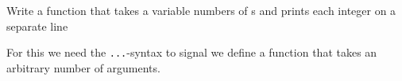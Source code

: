 \begin{Exercise}[title={Var args},difficulty=5]
\label{ex:varargs}
\Question\label{ex:varargs q1}
Write a function that takes a variable numbers of s and prints
each integer on a separate line
\end{Exercise}

\begin{Answer}
\Question
For this we need the \lstinline{...}-syntax to signal we define a
function that takes an arbitrary number of arguments.



\end{Answer}
